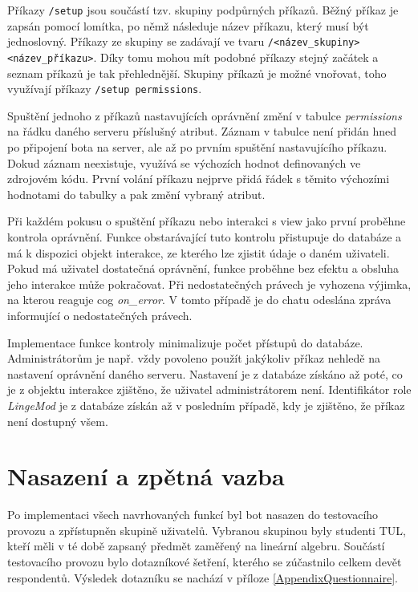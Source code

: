 \documentclass[FM]{tulthesis}
\begin{document}
	Příkazy \verb|/setup| jsou součástí tzv. skupiny podpůrných příkazů. Běžný příkaz je zapsán pomocí lomítka, po němž následuje název příkazu, který musí být jednoslovný. Příkazy ze skupiny se zadávají ve tvaru \verb|/<název_skupiny> <název_příkazu>|. Díky tomu mohou mít podobné příkazy stejný začátek a seznam příkazů je tak přehlednější. Skupiny příkazů je možné vnořovat, toho využívají příkazy \texttt{/setup permissions}.
	
	Spuštění jednoho z příkazů nastavujících oprávnění změní v tabulce \textit{permissions} na řádku daného serveru příslušný atribut. Záznam v tabulce není přidán hned po připojení bota na server, ale až po prvním spuštění nastavujícího příkazu. Dokud záznam neexistuje, využívá se výchozích hodnot definovaných ve zdrojovém kódu. První volání příkazu nejprve přidá řádek s těmito výchozími hodnotami do tabulky a pak změní vybraný atribut.
	
	Při každém pokusu o spuštění příkazu nebo interakci s view jako první proběhne kontrola oprávnění. Funkce obstarávající tuto kontrolu přistupuje do databáze a má k dispozici objekt interakce, ze kterého lze zjistit údaje o daném uživateli. Pokud má uživatel dostatečná oprávnění, funkce proběhne bez efektu a obsluha jeho interakce může pokračovat. Při nedostatečných právech je vyhozena výjimka, na kterou reaguje cog \textit{on\_error}. V tomto případě je do chatu odeslána zpráva informující o nedostatečných právech.
	
	Implementace funkce kontroly minimalizuje počet přístupů do databáze. Administrátorům je např. vždy povoleno použít jakýkoliv příkaz nehledě na nastavení oprávnění daného serveru. Nastavení je z databáze získáno až poté, co je z objektu interakce zjištěno, že uživatel administrátorem není. Identifikátor role \textit{LingeMod} je z databáze získán až v posledním případě, kdy je zjištěno, že příkaz není dostupný všem.

	\section{Nasazení a zpětná vazba}\label{Chapter5_3}
	
	Po implementaci všech navrhovaných funkcí byl bot nasazen do testovacího provozu a zpřístupněn skupině uživatelů. Vybranou skupinou byly studenti TUL, kteří měli v té době zapsaný předmět zaměřený na lineární algebru. Součástí testovacího provozu bylo dotazníkové šetření, kterého se zúčastnilo celkem devět respondentů. Výsledek dotazníku se nachází v příloze \ref{AppendixQuestionnaire}.
	
\end{document}
